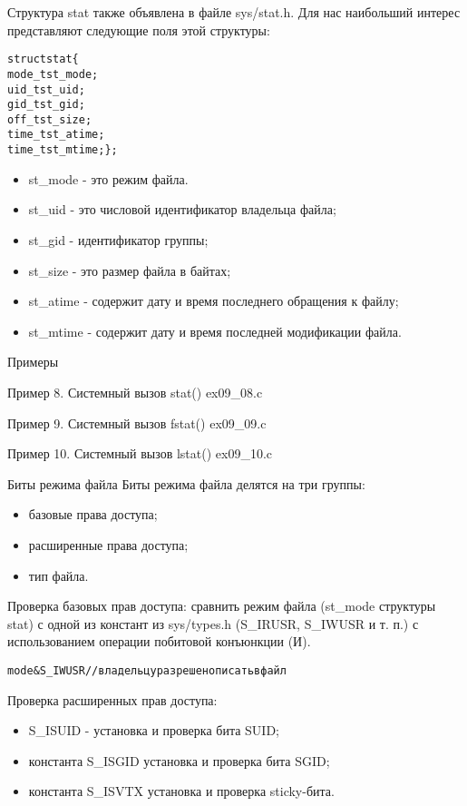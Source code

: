 \documentclass{beamer}
\begin{document}
\begin{frame}[fragile]
Структура stat также объявлена в файле sys/stat.h. Для нас наибольший интерес представляют следующие поля этой структуры:
\begin{alltt}
struct stat \{
  mode\_t st\_mode;
  uid\_t st\_uid;
  gid\_t st\_gid;
  off\_t st\_size;
  time\_t st\_atime;
  time\_t st\_mtime;\};
\end{alltt}
\begin{itemize}
\item st\_mode - это режим файла.
\item st\_uid - это числовой идентификатор владельца файла;
\item st\_gid - идентификатор группы;
\item st\_size - это размер файла в байтах;
\item st\_atime - содержит дату и время последнего обращения к файлу;
\item st\_mtime - содержит дату и время последней модификации файла.
\end{itemize}
\end{frame}

\begin{frame}[fragile]{Примеры}
\begin{block}{Пример 8. Системный вызов stat()}
ex09\_08.c
\end{block}
\begin{block}{Пример 9. Системный вызов fstat()}
ex09\_09.c
\end{block}
\begin{block}{Пример 10. Системный вызов lstat() }
ex09\_10.c
\end{block}
\end{frame}

\begin{frame}[fragile]{Биты режима файла}
Биты режима файла делятся на три группы:
\begin{itemize}
\item базовые права доступа;
\item расширенные права доступа;
\item тип файла.
\end{itemize}
Проверка базовых прав доступа: сравнить режим файла (st\_mode структуры stat) с одной из
констант из sys/types.h (S\_IRUSR, S\_IWUSR и т. п.) с использованием операции побитовой конъюнкции (И).
\begin{alltt}
mode & S_IWUSR //владельцу разрешено писать в файл
\end{alltt}
Проверка расширенных прав доступа:
\begin{itemize}
\item S\_ISUID - установка и проверка бита SUID;
\item константа S\_ISGID установка и проверка бита SGID;
\item константа S\_ISVTX установка и проверка sticky-бита.
\end{itemize}
\end{frame}
\end{document}
